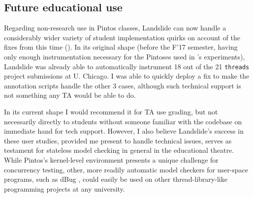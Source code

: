 \subsection{Future educational use}


Regarding non-research use in Pintos classes,
Landslide can now handle a considerably wider variety of student implementation quirks
on account of the fixes from this time (\sect{\ref{sec:education-pintos-instrumentation}}).
In its original shape
(before the F'17 semester,
having only enough instrumentation necessary for the Pintoses used in \sect{\ref{sec:quicksand-eval}}'s experiments),
Landslide was already able to automatically instrument 18 out of the 21 {\tt threads} project submissions at U. Chicago.
I was able to quickly deploy a fix to make the annotation scripts handle the other 3 cases,
although such technical support is not something any TA would be able to do.

In its current shape I would recommend it for TA use grading,
but not necessarily directly to students without someone familiar with the codebase on immediate hand for tech support.
However, I also believe Landslide's success in these user studies,
provided me present to handle technical issues,
serves as testament for stateless model checking in general in the educational theatre.
While Pintos's kernel-level environment presents a unique challenge for concurrency testing,
other, more readily automatic model checkers for user-space programs,
such as dBug \cite{dbug-ssv},
could easily be used on other thread-library-like programming projects at any university.

